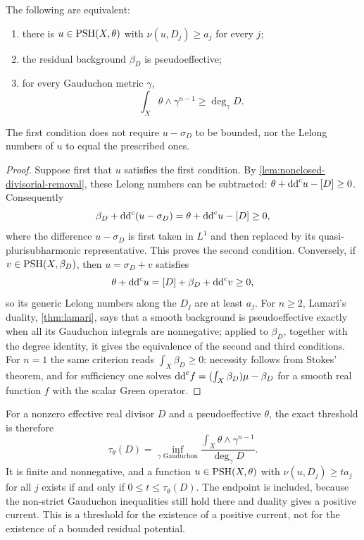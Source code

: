 \begin{proposition}\label{prop:divisorial-gaud-feasibility}
The following are equivalent:
\begin{enumerate}
\item there is $u\in\mathrm{PSH}(X,\theta)$ with $\nu(u,D_j)\geq a_j$ for every $j$;
\item the residual background $\beta_D$ is pseudoeffective;
\item for every Gauduchon metric $\gamma$,
\[
 \int_X\theta\wedge\gamma^{n-1}\geq\deg_\gamma D.
\]
\end{enumerate}
The first condition does not require $u-\sigma_D$ to be bounded, nor the Lelong numbers of $u$ to equal the prescribed ones.
\end{proposition}
\begin{proof}
Suppose first that $u$ satisfies the first condition. By \cref{lem:nonclosed-divisorial-removal}, these Lelong numbers can be subtracted: $\theta+\mathrm{dd}^{\mathrm{c}} u-[D]\geq0$. Consequently
\[
 \beta_D+\mathrm{dd}^{\mathrm{c}}(u-\sigma_D)=\theta+\mathrm{dd}^{\mathrm{c}} u-[D]\geq0,
\]
where the difference $u-\sigma_D$ is first taken in $L^1$ and then replaced by its quasi-plurisubharmonic representative. This proves the second condition. Conversely, if $v\in\mathrm{PSH}(X,\beta_D)$, then $u=\sigma_D+v$ satisfies
\[
 \theta+\mathrm{dd}^{\mathrm{c}} u=[D]+\beta_D+\mathrm{dd}^{\mathrm{c}} v\geq0,
\]
so its generic Lelong numbers along the $D_j$ are at least $a_j$. For $n\geq2$, Lamari's duality, \cref{thm:lamari}, says that a smooth background is pseudoeffective exactly when all its Gauduchon integrals are nonnegative; applied to $\beta_D$, together with the degree identity, it gives the equivalence of the second and third conditions. For $n=1$ the same criterion reads $\int_X\beta_D\geq0$: necessity follows from Stokes' theorem, and for sufficiency one solves $\mathrm{dd}^{\mathrm{c}} f=(\int_X\beta_D)\mu-\beta_D$ for a smooth real function $f$ with the scalar Green operator.
\end{proof}

For a nonzero effective real divisor $D$ and a pseudoeffective $\theta$, the exact threshold is therefore
\begin{equation}\label{eq:divisorial-gaud-threshold}
 \tau_\theta(D)=
 \inf_{\gamma\text{ Gauduchon}}
       \frac{\int_X\theta\wedge\gamma^{n-1}}{\deg_\gamma D}.
\end{equation}
It is finite and nonnegative, and a function $u\in\mathrm{PSH}(X,\theta)$ with $\nu(u,D_j)\geq ta_j$ for all $j$ exists if and only if $0\leq t\leq\tau_\theta(D)$. The endpoint is included, because the non-strict Gauduchon inequalities still hold there and duality gives a positive current. This is a threshold for the existence of a positive current, not for the existence of a bounded residual potential.

